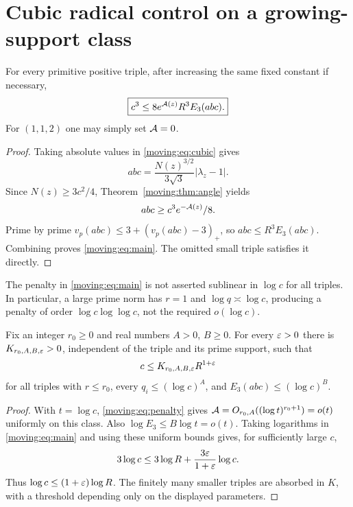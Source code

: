 \section{Cubic radical control on a growing-support class}
\begin{theorem}\label{moving:thm:general}
For every primitive positive triple, after increasing the same fixed constant if necessary,
\begin{equation}\label{moving:eq:main}
 \boxed{c^3\le8e^{\mathcal A(z)}R^3 E_3(abc).}
\end{equation}
For $(1,1,2)$ one may simply set $\mathcal A=0$.
\end{theorem}
\begin{proof}
Taking absolute values in \eqref{moving:eq:cubic} gives
\[
 abc=\frac{N(z)^{3/2}}{3\sqrt3}|\lambda_z-1|.
\]
Since $N(z)\ge3c^2/4$, Theorem~\ref{moving:thm:angle} yields
\[
 abc\ge c^3 e^{-\mathcal A(z)}/8.
\]
Prime by prime $v_p(abc)\le3+(v_p(abc)-3)_+$, so $abc\le R^3E_3(abc)$. Combining proves \eqref{moving:eq:main}. The omitted small triple satisfies it directly.
\end{proof}

The penalty in \eqref{moving:eq:main} is not asserted sublinear in $\log c$ for all triples. In particular, a large prime norm has $r=1$ and $\log q\asymp\log c$, producing a penalty of order $\log c\log\log c$, not the required $o(\log c)$.

\begin{corollary}\label{moving:cor:fixedrank}
Fix an integer $r_0\ge0$ and real numbers $A>0$, $B\ge0$. For every $\varepsilon>0$ there is $K_{r_0,A,B,\varepsilon}>0$, independent of the triple and its prime support, such that
\[
 c\le K_{r_0,A,B,\varepsilon} R^{1+\varepsilon}
\]
for all triples with $r\le r_0$, every $q_i\le(\log c)^A$, and $E_3(abc)\le(\log c)^B$.
\end{corollary}
\begin{proof}
With $t=\log c$, \eqref{moving:eq:penalty} gives
$\mathcal A=O_{r_0,A}((\log t)^{r_0+1})=o(t)$ uniformly on this class. Also $\log E_3\le B\log t=o(t)$. Taking logarithms in \eqref{moving:eq:main} and using these uniform bounds gives, for sufficiently large $c$,
\[
 3\log c\le3\log R+\frac{3\varepsilon}{1+\varepsilon}\log c.
\]
Thus $\log c\le(1+\varepsilon)\log R$. The finitely many smaller triples are absorbed in $K$, with a threshold depending only on the displayed parameters.
\end{proof}


